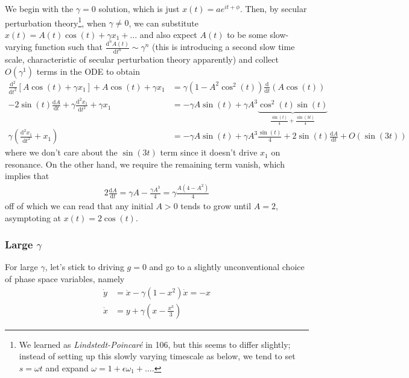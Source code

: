 \documentclass[12pt]{article}
\newcommand{\rd}[2]{\frac{\mathrm{d}#1}{\mathrm{d}#2}}
\newcommand{\rtd}[2]{\frac{\mathrm{d}^2#1}{\mathrm{d}#2^2}}
\begin{document}
We begin with the $\gamma=0$ solution, which is just $x(t) = ae^{it + \phi}$.
Then, by secular perturbation theory\footnote{We learned as
\emph{Lindstedt-Poincar\'e} in 106, but this seems to differ slightly; instead
of setting up this slowly varying timescale as below, we tend to set $s = \omega
t$ and expand $\omega = 1 + \epsilon \omega_1 +\dots$.}, when $\gamma \neq 0$,
we can substitute $x(t) = A(t)\cos(t) + \gamma x_1 +\dots$ and also expect
$A(t)$ to be some slow-varying function such that
$\frac{\mathrm{d}^nA(t)}{\mathrm{d}t^n} \sim \gamma^n$ (this is introducing a
second slow time scale, characteristic of secular perturbation theory
apparently) and collect $O(\gamma^1)$ terms in the ODE to obtain
\begin{align}
    \rtd{}{t}\left[ A\cos(t) + \gamma x_1 \right] + A\cos(t) + \gamma x_1 &=
    \gamma(1 - A^2\cos^2(t))\rd{}{t}(A\cos(t)) \nonumber\\
    - 2\sin(t)\rd{A}{t} + \gamma\rtd{x_1}{t} + \gamma x_1 &= -\gamma A\sin(t) +
    \gamma A^3\underbrace{\cos^2(t)\sin(t)}_{\frac{\sin(t)}{4} +
    \frac{\sin(3t)}{4}} \nonumber\\
    \gamma\left(\rtd{x_1}{t} + x_1\right) &= -\gamma A\sin(t) + \gamma
    A^3\frac{\sin(t)}{4} + 2\sin(t)\rd{A}{t} + O(\sin(3t))
\end{align}
where we don't care about the $\sin(3t)$ term since it doesn't drive $x_1$ on
resonance. On the other hand, we require the remaining term vanish, which
implies that
\begin{align}
    2\rd{A}{t} = \gamma A - \frac{\gamma A^3}{4} = \gamma \frac{A(4 - A^2)}{4}
\end{align}
off of which we can read that any initial $A > 0$ tends to grow until $A = 2$,
asymptoting at $x(t) = 2\cos(t)$.

\subsubsection{Large $\gamma$}

For large $\gamma$, let's stick to driving $g=0$ and go to a slightly
unconventional choice of phase space variables, namely
\begin{align}
    \dot{y} &= \ddot{x} - \gamma(1-x^2)\dot{x} = -x\\
    \dot{x} &= y + \gamma\left( x - \frac{x^3}{3} \right)
\end{align}
\end{document}
